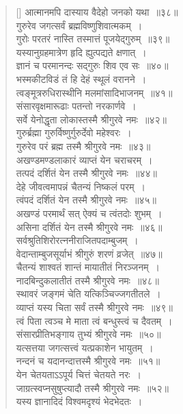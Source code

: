\documentclass[twoside,12pt,notitlepage]{book}
\begin{document}
\begin{verse}[\versewidth]
आत्मानमपि दास्याय वैदेहो जनको यथा~॥३८॥\\
गुरुरेव जगत्सर्वं ब्रह्मविष्णुशिवात्मकम्~।\\[-6pt]
गुरोः परतरं नास्ति तस्मात्तं पूजयेद्गुरुम्~॥३९॥\\
यस्यानुग्रहमात्रेण हृदि ह्युत्पद्यते क्षणात्~।\\[-6pt]
ज्ञानं च परमानन्दः सद्गुरुः शिव एव सः~॥४०॥\\
भस्मकीटविडं तं हि देहं स्थूलं वरानने~।\\[-6pt]
त्वङ्‍मूत्ररुधिरास्थीनि मलमांसादिभाजनम्~॥४१॥\\
संसारवृक्षमारूढाः पतन्तो नरकार्णवे~।\\[-6pt]
सर्वे येनोद्धृता लोकास्तस्मै श्रीगुरवे नमः~॥४२॥\\
गुरुर्ब्रह्मा गुरुर्विष्णुर्गुरुर्देवो महेश्वरः~।\\[-6pt]
गुरुरेव परं ब्रह्म तस्मै श्रीगुरवे नमः~॥४३॥\\
अखण्डमण्डलाकारं व्याप्तं येन चराचरम्~।\\[-6pt]
तत्पदं दर्शितं येन तस्मै श्रीगुरवे नमः~॥४४॥\\
देहे जीवत्वमापन्नं चैतन्यं निष्कलं परम्~।\\[-6pt]
त्वंपदं दर्शितं येन तस्मै श्रीगुरवे नमः~॥४५॥\\
अखण्डं परमार्थं सत् ऐक्यं च त्वंतदोः शुभम्~।\\[-6pt]
असिना दर्शितं येन तस्मै श्रीगुरवे नमः~॥४६॥\\
सर्वश्रुतिशिरोरत्ननीराजितपदाम्बुजम्~।\\[-6pt]
वेदान्ताम्बुजसूर्याभं श्रीगुरुं शरणं व्रजेत्~॥४७॥\\
चैतन्यं शाश्वतं शान्तं मायातीतं निरञ्जनम्~।\\[-6pt]
नादबिन्दुकलातीतं तस्मै श्रीगुरवे नमः~॥४८॥\\
स्थावरं जङ्गमं चेति यत्किञ्चिज्जगतीतले~।\\[-6pt]
व्याप्तं यस्य चिता सर्वं तस्मै श्रीगुरवे नमः~॥४९॥\\
त्वं पिता त्वञ्च मे माता त्वं बन्धुस्त्वं च दैवतम्~।\\[-6pt]
संसारप्रीतिभङ्गाय तुभ्यं श्रीगुरवे नमः~॥५०॥\\
यत्सत्तया जगत्सत्त्वं यत्प्रकाशेन भायुतम्~।\\[-6pt]
नन्दनं च यदानन्दात्तस्मै श्रीगुरवे नमः~॥५१॥\\
येन चेतयताऽऽपूर्य चित्तं चेतयते नरः~।\\[-6pt]
जाग्रत्स्वप्नसुषुप्त्यादौ तस्मै श्रीगुरवे नमः~॥५२॥\\
यस्य ज्ञानादिदं विश्वमदृश्यं भेदभेदतः~।\\[-6pt]

\end{verse}
\end{document}
